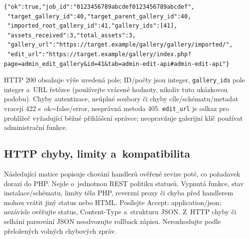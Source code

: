\documentclass[11pt,a4paper]{article}
\newcommand{\codeword}[1]{\nolinkurl{#1}}
\begin{document}
\begin{lstlisting}[language={}]
{"ok":true,"job_id":"0123456789abcdef0123456789abcdef",
 "target_gallery_id":40,"target_parent_gallery_id":40,
 "imported_root_gallery_id":41,"gallery_ids":[41],
 "assets_received":3,"total_assets":3,
 "gallery_url":"https://target.example/gallery/gallery/imported/",
 "edit_url":"https://target.example/gallery/index.php?page=admin_edit_gallery&id=41&tab=admin-edit-api#admin-edit-api"}
\end{lstlisting}

HTTP 200 obsahuje výše uvedená pole; ID/počty jsou integer, \codeword{gallery_ids} pole
integer a~URL řetězce (používejte vrácené hodnoty, nikoliv tuto ukázkovou podobu). Chyby
autentizace, neúplné soubory či chyby cíle/schématu/metadat vracejí 422 s~ok=false/error,
nesprávná metoda 405. \codeword{edit_url} je odkaz pro prohlížeč vyžadující běžné přihlášení
správce; neopravňuje galerijní klíč používat administrační funkce.

\subsection{\texorpdfstring{HTTP chyby, limity a~kompatibilita}{HTTP chyby, limity a kompatibilita}}

\label{api352:errors}

Následující matice popisuje chování handlerů ověřené revize poté, co požadavek dorazí do
PHP. Nejde o~jednotnou REST politiku statusů. Vypnutá funkce, stav instalace/schématu,
limity těla PHP, reverzní proxy či chyba před handlerem mohou vrátit jiný status nebo HTML.
Posílejte Accept: application/json; nezávisle ověřujte status, Content-Type a~strukturu
JSON. Z~HTTP chyby či selhání parsování JSON neodvozujte rollback zápisu. Nerozhodujte podle
přeložených volných chybových zpráv.
\end{document}
